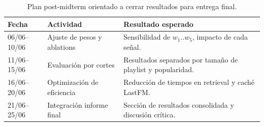 \documentclass[10pt,letterpaper]{article}
\begin{document}
\begin{table}[H]
\centering
\small
\begin{tabular}{p{2.4cm}p{4.0cm}p{7.2cm}}
\toprule
\textbf{Fecha} & \textbf{Actividad} & \textbf{Resultado esperado}\\
\midrule
06/06--10/06 & Ajuste de pesos y ablations & Sensibilidad de $w_1..w_5$, impacto de cada señal.\\
11/06--15/06 & Evaluación por cortes & Resultados separados por tamaño de playlist y popularidad.\\
16/06--20/06 & Optimización de eficiencia & Reducción de tiempos en retrieval y caché LastFM.\\
21/06--25/06 & Integración informe final & Sección de resultados consolidada y discusión crítica.\\
\bottomrule
\end{tabular}
\caption{Plan post-midterm orientado a cerrar resultados para entrega final.}
\label{tab:plan2}
\end{table}
\end{document}
